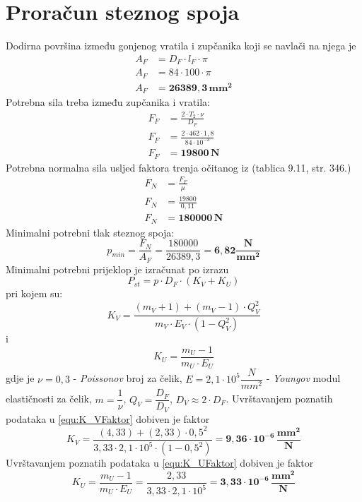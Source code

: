 \documentclass[11pt,a4paper]{report}
\begin{document}
\section{Proračun steznog spoja}
Dodirna površina između gonjenog vratila i zupčanika koji se navlači na njega je
\begin{align*}
A_F&=D_F \cdot l_F \cdot \pi \\
A_F&=84 \cdot 100 \cdot \pi \\
A_F&=\mathbf{26389,3 \, mm^2}
\end{align*}
Potrebna sila treba između zupčanika i vratila:
\begin{align*}
F_F&=\frac{2 \cdot T_2 \cdot \nu}{D_F}\\
F_F&=\frac{2 \cdot 462 \cdot 1,8}{84\cdot 10^{-3}}\\
F_F&=\mathbf{19800 \, N}
\end{align*}
Potrebna normalna sila usljed faktora trenja očitanog iz \cite{krivzan1998osnove}(tablica 9.11, str. 346.)
\begin{align*}
F_N&=\frac{F_F}{\mu}\\
F_N&=\frac{19800}{0,11}\\
F_N&=\mathbf{180000 \, N}
\end{align*}
Minimalni potrebni tlak steznog spoja:$$ p_{min}=\frac{F_N}{A_F} = \frac{180000}{26389,3}= \mathbf{6,82 \dfrac{N}{mm^2}}$$
Minimalni potrebni prijeklop je izračunat po izrazu
\begin{equation}
P_{st}=p \cdot D_F \cdot (K_V+K_U)\label{equ:Prijeklop}
\end{equation}
pri kojem su:
\begin{equation}
K_V=\frac{(m_V+1)+(m_V-1) \cdot Q_V^2}{m_V \cdot E_V \cdot (1-Q_V^2)}\label{equ:K_VFaktor}
\end{equation} i
\begin{equation}
K_U=\frac{m_U-1}{m_U \cdot E_U}\label{equ:K_UFaktor}
\end{equation}
gdje je $\nu=0,3$ - \textit{Poissonov} broj za čelik, $E=2,1 \cdot 10^5 \dfrac{N}{mm^2}$ - \textit{Youngov} modul elastičnosti za čelik, $m=\dfrac{1}{\nu}$, $Q_V=\dfrac{D_F}{D_V}$, $D_V\approx 2 \cdot D_F$.
Uvrštavanjem poznatih podataka u \eqref{equ:K_VFaktor} dobiven je faktor 
$$
K_V=\frac{(4,33)+(2,33) \cdot 0,5^2}{3,33 \cdot 2,1\cdot 10^5 \cdot (1-0,5^2)} \mathbf{= 9,36 \cdot 10^{-6} \, \dfrac{mm^2}{N}}
$$
Uvrštavanjem poznatih podataka u \eqref{equ:K_UFaktor} dobiven je faktor
$$
K_U=\frac{m_U-1}{m_U \cdot E_U}=\frac{2,33}{3,33 \cdot 2,1\cdot 10^5}\mathbf{= 3,33 \cdot 10^{-6} \, \dfrac{mm^2}{N}}
$$
\end{document}
